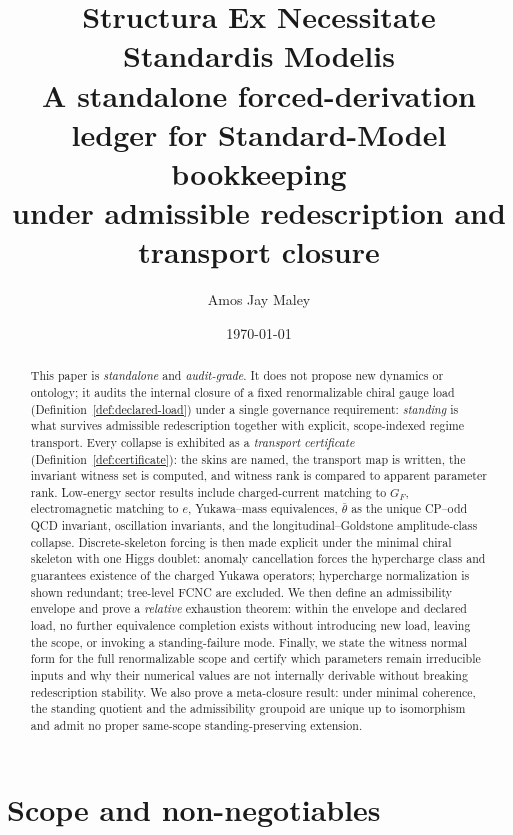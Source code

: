 \documentclass[11pt]{article}
\title{\textbf{Structura Ex Necessitate Standardis Modelis}\\
\large A standalone forced-derivation ledger for Standard-Model bookkeeping\\
\large under admissible redescription and transport closure}
\author{Amos Jay Maley}
\date{\today}
\theoremstyle{remark}
\begin{document}
\maketitle

\begin{abstract}
This paper is \emph{standalone} and \emph{audit-grade}. It does not propose new dynamics or ontology;
it audits the internal closure of a fixed renormalizable chiral gauge load
(Definition~\ref{def:declared-load}) under a single governance requirement:
\emph{standing} is what survives admissible redescription together with explicit, scope-indexed regime
transport. Every collapse is exhibited as a \emph{transport certificate}
(Definition~\ref{def:certificate}): the skins are named, the transport map is written, the invariant
witness set is computed, and witness rank is compared to apparent parameter rank.
Low-energy sector results include charged-current matching to $G_F$, electromagnetic matching to $e$,
Yukawa--mass equivalences, $\bar\theta$ as the unique CP--odd QCD invariant, oscillation invariants, and
the longitudinal--Goldstone amplitude-class collapse. Discrete-skeleton forcing is then made explicit
under the minimal chiral skeleton with one Higgs doublet: anomaly cancellation forces the hypercharge
class and guarantees existence of the charged Yukawa operators; hypercharge normalization is shown
redundant; tree-level FCNC are excluded. We then define an admissibility envelope and prove a
\emph{relative} exhaustion theorem: within the envelope and declared load, no further equivalence
completion exists without introducing new load, leaving the scope, or invoking a standing-failure mode.
Finally, we state the witness normal form for the full renormalizable scope and certify which
parameters remain irreducible inputs and why their numerical values are not internally derivable
without breaking redescription stability. We also prove a meta-closure result: under minimal coherence, the standing quotient and the admissibility groupoid are unique up to isomorphism and admit no proper same-scope standing-preserving extension.
\end{abstract}

\tableofcontents

\section{Scope and non-negotiables}
\end{document}
